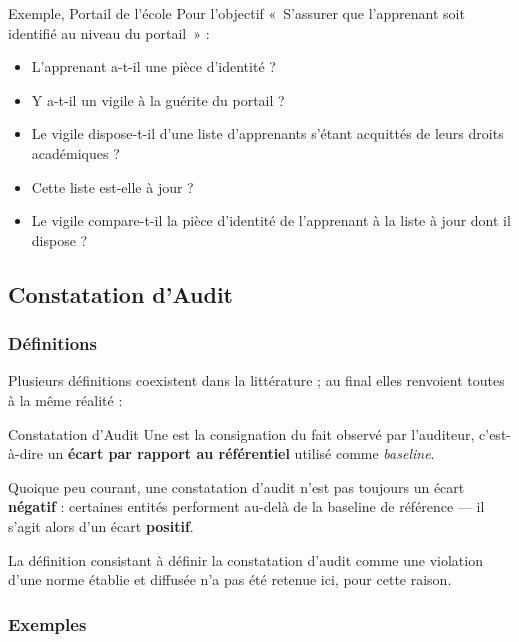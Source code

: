 \begin{boxlizbiz}{Exemple, Portail de l'école}
Pour l'objectif «~S'assurer que l'apprenant soit identifié au niveau du portail~» :
\begin{itemize}
  \item L'apprenant a-t-il une pièce d'identité ?
  \item Y a-t-il un vigile à la guérite du portail ?
  \item Le vigile dispose-t-il d'une liste d'apprenants s'étant acquittés de leurs droits
    académiques ?
  \item Cette liste est-elle à jour ?
  \item Le vigile compare-t-il la pièce d'identité de l'apprenant à la liste à jour dont
    il dispose ?
\end{itemize}
\end{boxlizbiz}

\subsection{Constatation d'Audit}

\subsubsection{Définitions}

Plusieurs définitions coexistent dans la littérature ; au final elles renvoient toutes
à la même réalité :

\begin{boxdef}{Constatation d'Audit}
Une  est la consignation du fait observé par l'auditeur,
c'est-à-dire un \textbf{écart par rapport au référentiel} utilisé comme
\textit{baseline}.

Quoique peu courant, une constatation d'audit n'est pas toujours un écart
\textbf{négatif} : certaines entités performent au-delà de la baseline de référence —
il s'agit alors d'un écart \textbf{positif}.
\end{boxdef}

La définition consistant à définir la constatation d'audit comme une violation d'une
norme établie et diffusée n'a pas été retenue ici, pour cette raison.

\subsubsection{Exemples}

